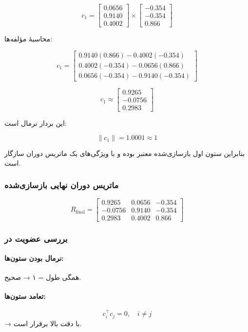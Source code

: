 \documentclass{article}
\begin{document}
\[
c_1 =
\begin{bmatrix}
	0.0656 \\ 0.9140 \\ 0.4002
\end{bmatrix}
\times
\begin{bmatrix}
	-0.354 \\ -0.354 \\ 0.866
\end{bmatrix}
\]

محاسبهٔ مؤلفه‌ها:

\[
c_1 =
\begin{bmatrix}
	0.9140(0.866) - 0.4002(-0.354) \\
	0.4002(-0.354) - 0.0656(0.866) \\
	0.0656(-0.354) - 0.9140(-0.354)
\end{bmatrix}
\]

\[
c_1 \approx
\begin{bmatrix}
	0.9265 \\ -0.0756 \\ 0.2983
\end{bmatrix}
\]

این بردار نرمال است:

\[
\|c_1\| = 1.0001 \approx 1
\]

بنابراین ستون اول بازسازی‌شده معتبر بوده و با ویژگی‌های یک ماتریس دوران سازگار است.


\subsubsection{ماتریس دوران نهایی بازسازی‌شده}

\[
R_{\text{final}}=
\begin{bmatrix}
	0.9265 & 0.0656 & -0.354 \\
	-0.0756 & 0.9140 & -0.354 \\
	0.2983 & 0.4002 & 0.866
\end{bmatrix}
\]

\subsubsection{ بررسی عضویت در }

\paragraph{نرمال بودن ستون‌ها:}  
همگی طول = ۱ → صحیح.

\paragraph{تعامد ستون‌ها:}  
\[
c_i^\top c_j = 0, \quad i\neq j
\]
→ با دقت بالا برقرار است.
\end{document}
